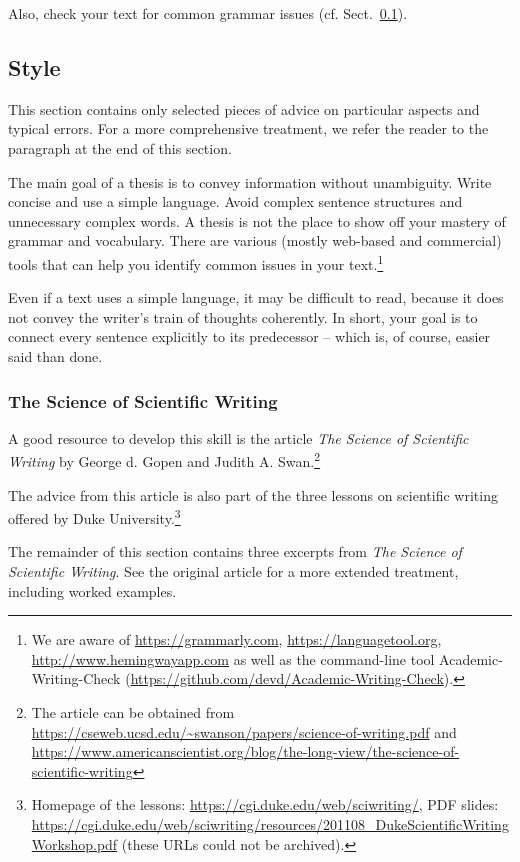 Also, check your text for common grammar issues (cf. Sect.~\ref{sec:style}).

\subsection{Style}
\label{sec:style}

This section contains only selected pieces of advice on particular aspects and typical errors. For a more comprehensive treatment, we refer the reader to the paragraph  at the end of this section.

The main goal of a thesis is to convey information without unambiguity. Write concise and use a simple language. Avoid complex sentence structures and unnecessary complex words. A thesis is not the place to show off your mastery of grammar and vocabulary. There are various (mostly web-based and commercial) tools that can help you identify common issues in your text.\footnote{We are aware of \url{https://grammarly.com}, \url{https://languagetool.org}, \url{http://www.hemingwayapp.com} as well as the command-line tool Academic-Writing-Check (\url{https://github.com/devd/Academic-Writing-Check}).}

Even if a text uses a simple language, it may be difficult to read, because it does not convey the writer's train of thoughts coherently. In short, your goal is to connect every sentence explicitly to its predecessor – which is, of course, easier said than done.

\subsubsection{The Science of Scientific Writing}

A good resource to develop this skill is the article \emph{The Science of Scientific Writing} by George d. Gopen and Judith A. Swan.\footnote{The article can be obtained from \url{https://cseweb.ucsd.edu/~swanson/papers/science-of-writing.pdf} and \url{https://www.americanscientist.org/blog/the-long-view/the-science-of-scientific-writing}} 

The advice from this article is also part of the three lessons on scientific writing offered by Duke University.\footnote{Homepage of the lessons: \url{https://cgi.duke.edu/web/sciwriting/}, PDF slides: \url{https://cgi.duke.edu/web/sciwriting/resources/201108_DukeScientificWritingWorkshop.pdf} (these URLs could not be archived).}

The remainder of this section contains three excerpts from \emph{The Science of Scientific Writing}. See the original article for a more extended treatment, including worked examples.

